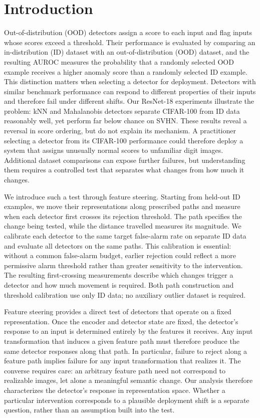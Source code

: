 \documentclass[twoside]{article}
\begin{document}
\section{Introduction}
\label{sec:Introduction}
Out-of-distribution (OOD) detectors \cite{liang2020enhancing,tack2020csi,hendrycks2018baseline} assign a score to each input and flag inputs whose scores exceed a threshold. Their performance is evaluated by comparing an in-distribution (ID) dataset with an out-of-distribution (OOD) dataset, and the resulting AUROC measures the probability that a randomly selected OOD example receives a higher anomaly score than a randomly selected ID example. 
This distinction matters when selecting a detector for deployment. Detectors with similar benchmark performance can respond to different properties of their inputs and therefore fail under different shifts. Our ResNet-18 experiments illustrate the problem: kNN and Mahalanobis detectors separate CIFAR-100 from ID data reasonably well, yet perform far below chance on SVHN. These results reveal a reversal in score ordering, but do not explain its mechanism. A practitioner selecting a detector from its CIFAR-100 performance could therefore deploy a system that assigns unusually normal scores to unfamiliar digit images. Additional dataset comparisons can expose further failures, but understanding them requires a controlled test that separates what changes from how much it changes.

We introduce such a test through feature steering. Starting from held-out ID examples, we move their representations along prescribed paths and measure when each detector first crosses its rejection threshold. The path specifies the change being tested, while the distance travelled measures its magnitude. We calibrate each detector to the same target false-alarm rate on separate ID data and evaluate all detectors on the same paths. This calibration is essential: without a common false-alarm budget, earlier rejection could reflect a more permissive alarm threshold rather than greater sensitivity to the intervention. The resulting first-crossing measurements describe which changes trigger a detector and how much movement is required. Both path construction and threshold calibration use only ID data; no auxiliary outlier dataset is required.

Feature steering provides a direct test of detectors that operate on a fixed representation. Once the encoder and detector state are fixed, the detector’s response to an input is determined entirely by the features it receives. Any input transformation that induces a given feature path must therefore produce the same detector responses along that path. In particular, failure to reject along a feature path implies failure for any input transformation that realizes it. The converse requires care: an arbitrary feature path need not correspond to realizable images, let alone a meaningful semantic change. Our analysis therefore characterizes the detector’s response in representation space. Whether a particular intervention corresponds to a plausible deployment shift is a separate question, rather than an assumption built into the test.
\end{document}
